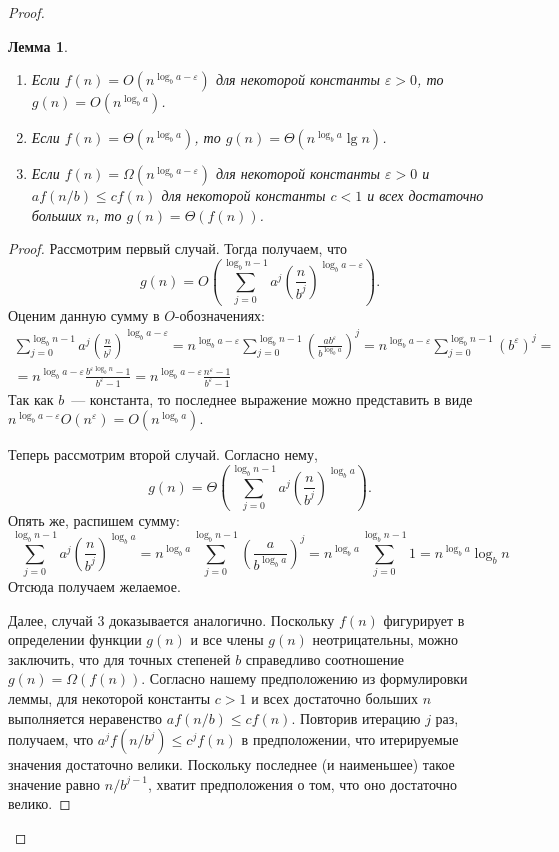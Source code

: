 \documentclass[a4paper,12pt]{article}
\newtheorem*{lemma}{Лемма}
\begin{document}
\begin{proof}
\begin{lemma}
		\begin{enumerate}
			\item Если \(f(n) = O(n^{\log_b a - \varepsilon})\) для некоторой константы \(\varepsilon > 0\), то \(g(n) = O(n^{\log_b a})\).
			\item Если \(f(n) = \Theta(n^{\log_b a})\), то \(g(n) = \Theta(n^{\log_b a}\lg n)\).
			\item Если \(f(n) = \Omega(n^{\log_b a - \varepsilon})\) для некоторой константы \(\varepsilon > 0\) и \(af(n/b) \leqslant cf(n)\) для некоторой константы \(c < 1\) и всех достаточно больших \(n\), то \(g(n) = \Theta(f(n))\).
		\end{enumerate}
	\end{lemma}
	\begin{proof}
		Рассмотрим первый случай. Тогда получаем, что \[g(n) = O\left(\sum_{j = 0}^{\log_b n - 1}a^j \left(\frac{n}{b^j}\right)^{\log_b a - \varepsilon}\right).\]
		Оценим данную сумму в \(O\)-обозначениях:
		\begin{multline*}
			\sum_{j = 0}^{\log_b n - 1}a^j \left(\frac{n}{b^j}\right)^{\log_b a - \varepsilon} = n^{\log_b a - \varepsilon} \sum_{j = 0}^{\log_b n - 1} \left(\frac{ab^{\varepsilon}}{b^{\log_b a}}\right)^j = n^{\log_b a - \varepsilon} \sum_{j = 0}^{\log_b n - 1} \left(b^{\varepsilon}\right)^j = \\ = n^{\log_b a - \varepsilon} \frac{b^{\varepsilon \log_b n} - 1}{b^{\varepsilon} - 1}
			= n^{\log_b a - \varepsilon} \frac{n^{\varepsilon} - 1}{b^{\varepsilon} - 1}
		\end{multline*}
		Так как \(b\)~--- константа, то последнее выражение можно представить в виде \(n^{\log_b a - \varepsilon}O(n^{\varepsilon}) = O(n^{\log_b a})\).
		
		Теперь рассмотрим второй случай. Согласно нему, \[g(n) = \Theta\left(\sum_{j = 0}^{\log_b n - 1}a^j \left(\frac{n}{b^j}\right)^{\log_b a}\right).\]Опять же, распишем сумму:
		\[\sum_{j = 0}^{\log_b n - 1}a^j \left(\frac{n}{b^j}\right)^{\log_b a} = n^{\log_b a} \sum_{j = 0}^{\log_b n - 1}\left(\frac{a}{b^{\log_b a}}\right)^{j} = n^{\log_b a} \sum_{j = 0}^{\log_b n - 1} 1 = n^{\log_b a} \log_b n\]
		Отсюда получаем желаемое.
		
		Далее, случай 3 доказывается аналогично. Поскольку \(f(n)\) фигурирует в определении функции \(g(n)\) и все члены \(g(n)\) неотрицательны, можно заключить, что для точных степеней \(b\) справедливо соотношение \(g(n) = \Omega(f(n))\). Согласно нашему предположению из формулировки леммы, для некоторой константы \(c > 1\) и всех достаточно больших \(n\) выполняется неравенство \(af(n/b) \leqslant cf(n)\). Повторив итерацию \(j\) раз, получаем, что \(a^{j}f(n/b^j) \leqslant c^jf(n)\) в предположении, что итерируемые значения достаточно велики. Поскольку последнее (и наименьшее) такое значение равно \(n/b^{j - 1}\), хватит предположения о том, что оно достаточно велико.
		

\end{proof}
\end{proof}
\end{document}
